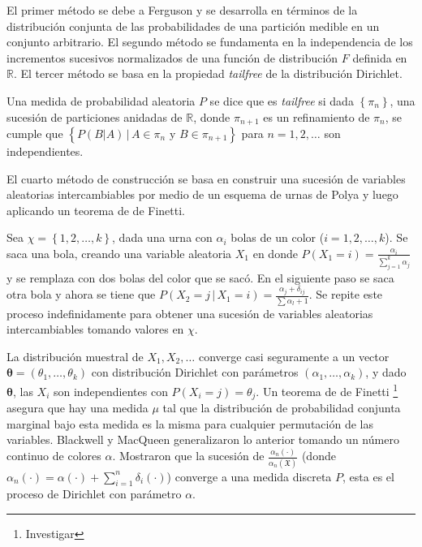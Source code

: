 \documentclass[runningheads,a4paper]{article}
\begin{document}
El primer método se debe a Ferguson y se desarrolla en términos de la distribución conjunta de las probabilidades de una partición %
medible en un conjunto arbitrario. El segundo método se fundamenta en la independencia de los incrementos sucesivos normalizados %
de una función de distribución $F$ definida en $\mathbb{R}$. El tercer método se basa en la propiedad \textit{tailfree} de la %
distribución Dirichlet.

\begin{defi}[Tailfree]
Una medida de probabilidad aleatoria $P$ se dice que es \textit{tailfree} si dada $\left\{ \pi_{n} \right\}$, una sucesión de %
particiones anidadas de $\mathbb{R}$, donde $\pi_{n+1}$ es un refinamiento de $\pi_{n}$, se cumple que %
$\left\{ %
P \left( B | A \right) \,|\, A \in \pi_{n} \text{ y } B \in \pi_{n+1} %
\right\}$ para $n = 1,2,\ldots$ son independientes.
\end{defi}

El cuarto método de construcción se basa en construir una sucesión de variables aleatorias intercambiables por medio de un %
esquema de urnas de Polya y luego aplicando un teorema de de Finetti.

\begin{defi}
Sea $\chi = \left\{ 1, 2, \ldots, k \right\}$, dada una urna con $\alpha_{i}$ bolas de un color ($i = 1, 2, \ldots, k$). %
Se saca una bola, creando una variable aleatoria $X_{1}$ en donde $P \left( X_{1} = i \right) = \frac{\alpha_{i}}{\sum_{j = 1}^{k} %
\alpha_{j}}$ y se remplaza con dos bolas del color que se sacó. En el siguiente paso se saca otra bola y ahora se tiene que $ P %
\left( X_{2} = j \,|\, X_{1} = i \right) = \frac{\alpha_{j} + \delta_{ij}}{\sum \alpha_{l} + 1} $. Se repite este proceso %
indefinidamente para obtener una sucesión de variables aleatorias intercambiables tomando valores en $\chi$.
\end{defi}

La distribución muestral de $X_{1}, X_{2}, \ldots$ converge casi seguramente a un vector $\mathbf{\theta} = \left( \theta_{1}, %
\ldots, \theta_{k} \right)$ con distribución Dirichlet con parámetros $\left(\alpha_{1}, \ldots, \alpha_{k} \right)$, y dado %
$\mathbf{\theta}$, las $X_{i}$ son independientes con $P\left( X_{i} = j \right) = \theta_{j}$. Un teorema de de Finetti%
\footnote{Investigar} asegura que hay una medida $\mu$ tal que la distribución de probabilidad conjunta marginal bajo esta %
medida es la misma para cualquier permutación de las variables. Blackwell y MacQueen generalizaron lo anterior tomando un %
número continuo de colores $\alpha$. Mostraron que la sucesión de $\frac{\alpha_{n}(\cdot)}{\alpha_{n}\left( \mathfrak{X} %
\right)}$ (donde $\alpha_{n}(\cdot) = \alpha(\cdot) + \sum_{i = 1}^{n} \delta_{i}(\cdot)$) converge a una medida discreta $P$, %
esta es el proceso de Dirichlet con parámetro $\alpha$.
\end{document}
